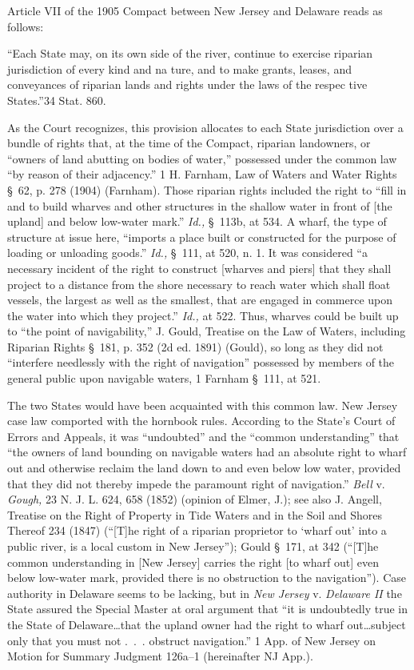 {  Article VII of the 1905 Compact between New Jersey and Delaware reads
as follows:

    ``Each State may, on its own side of the river, continue to
    exercise riparian jurisdiction of every kind and na ture, and to
    make grants, leases, and conveyances of riparian lands and rights
    under the laws of the respec tive States.''34 Stat. 860.

\noindent As the Court recognizes, this provision allocates to each State
jurisdiction over a bundle of rights that, at the time of the Compact,
riparian landowners, or ``owners of land abutting on bodies of
water,'' possessed under the common law ``by reason of their
adjacency.'' 1 H. Farnham, Law of Waters and Water Rights \S~62,
p. 278 (1904) (Farnham). Those riparian rights included the right to
``fill in and to build wharves and other structures in the shallow
water in front of [the upland] and below low-water mark.'' \emph{Id.,}
\S~113b, at 534. A wharf, the type of structure at issue here,
``imports a place built or constructed for the purpose of loading
or unloading goods.'' \emph{Id.,} \S~111, at 520, n. 1. It was
considered ``a necessary incident of the right to construct [wharves
and piers] that they shall project to a distance from the shore
necessary to reach water which shall float vessels, the largest as
well as the smallest, that are engaged in commerce upon the water into
which they project.'' \emph{Id.,} at 522. Thus, wharves could be built
up to ``the point of navigability,'' J. Gould, Treatise on the Law
of Waters, including Riparian Rights \S~181, p. 352 (2d ed. 1891)
(Gould), so long as they did not ``interfere needlessly with the
right of navigation'' possessed by members of the general public upon
navigable waters, 1 Farnham \S~111, at 521.

  The two States would have been acquainted with this common law. New
Jersey case law comported with the horn\newpage book rules. According
to the State's Court of Errors and Appeals, it was ``undoubted''
and the ``common understanding'' that ``the owners of land bounding
on navigable waters had an absolute right to wharf out and otherwise
reclaim the land down to and even below low water, provided that they
did not thereby impede the paramount right of navigation.'' \emph{Bell}
v. \emph{Gough,} 23 N. J. L. 624, 658 (1852) (opinion of Elmer, J.); see
also J. Angell, Treatise on the Right of Property in Tide Waters and in
the Soil and Shores Thereof 234 (1847) (``[T]he right of a riparian
proprietor to ‘wharf out' into a public river, is a local custom in
New Jersey''); Gould \S~171, at 342 (``[T]he common understanding in
[New Jersey] carries the right [to wharf out] even below low-water mark,
provided there is no obstruction to the navigation''). Case authority
in Delaware seems to be lacking, but in \emph{New Jersey} v. \emph{Delaware
II} the State assured the Special Master at oral argument that ``it
is undoubtedly true in the State of Delaware\dots that the upland
owner had the right to wharf out\dots subject only that you must not
.~.~. obstruct navigation.'' 1 App. of New Jersey on Motion for
Summary Judgment 126a--1 (hereinafter NJ App.).

}
